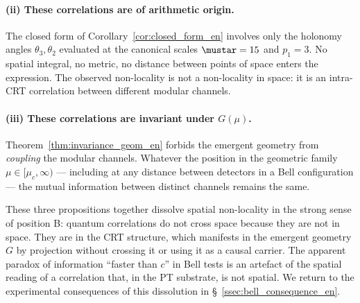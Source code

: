 \paragraph{(ii) These correlations are of arithmetic origin.}
The closed form of Corollary~\ref{cor:closed_form_en} involves
only the holonomy angles $\theta_3, \theta_2$ evaluated at the
canonical scales $\mustar = 15$ and $p_1 = 3$. No spatial
integral, no metric, no distance between points of space enters
the expression. The observed non-locality is not a non-locality
in space: it is an intra-CRT correlation between different
modular channels.

\paragraph{(iii) These correlations are invariant under $G(\mu)$.}
Theorem~\ref{thm:invariance_geom_en} forbids the emergent
geometry from \emph{coupling} the modular channels. Whatever the
position in the geometric family $\mu \in [\mu_c, \infty)$ ---
including at any distance between detectors in a Bell
configuration --- the mutual information between distinct
channels remains the same.

These three propositions together dissolve spatial non-locality
in the strong sense of position B: quantum correlations do not
cross space because they are not in space. They are in the CRT
structure, which manifests in the emergent geometry $G$ by
projection without crossing it or using it as a causal carrier.
The apparent paradox of information ``faster than $c$'' in Bell
tests is an artefact of the spatial reading of a correlation that,
in the PT substrate, is not spatial. We return to the experimental
consequences of this dissolution in
\S~\ref{ssec:bell_consequence_en}.
